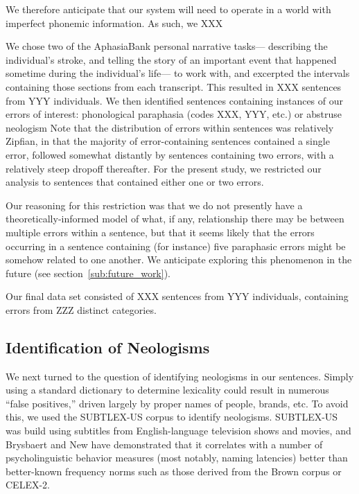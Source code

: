 \documentclass[11pt,letterpaper]{article}
\begin{document}
We therefore anticipate that our system will need to operate in a world with imperfect phonemic information.
As such, we XXX %

We chose two of the AphasiaBank personal narrative tasks--- describing the individual's stroke, and telling the story of an important event that happened sometime during the individual's life--- to work with, and excerpted the intervals containing those sections from each transcript.
This resulted in XXX sentences from YYY individuals. %
We then identified sentences containing instances of our errors of interest: phonological paraphasia (codes XXX, YYY, etc.) or abstruse neologism %
Note that the distribution of errors within sentences was relatively Zipfian, in that the majority of error-containing sentences contained a single error, followed somewhat distantly by sentences containing two errors, with a relatively steep dropoff thereafter.
For the present study, we restricted our analysis to sentences that contained either one or two errors.

Our reasoning for this restriction was that we do not presently have a theoretically-informed model of what, if any, relationship there may be between multiple errors within a sentence, but that it seems likely that the errors occurring in a sentence containing (for instance) five paraphasic errors might be somehow related to one another.
We anticipate exploring this phenomenon in the future (see section~\ref{sub:future_work}).

Our final data set consisted of XXX sentences from YYY individuals, containing errors from ZZZ distinct categories. %


\subsection{Identification of Neologisms} %
\label{sub:identification_of_neologisms}

We next turned to the question of identifying neologisms in our sentences.
Simply using a standard dictionary to determine lexicality could result in numerous ``false positives,'' driven largely by proper names of people, brands, etc.
To avoid this, we used the SUBTLEX-US corpus \cite{Brysbaert:2009du} to identify neologisms. SUBTLEX-US was build using subtitles from English-language television shows and movies, and Brysbaert and New have demonstrated that it correlates with a number of psycholinguistic behavior measures (most notably, naming latencies) better than better-known frequency norms such as those derived from the Brown corpus or CELEX-2.
\end{document}

